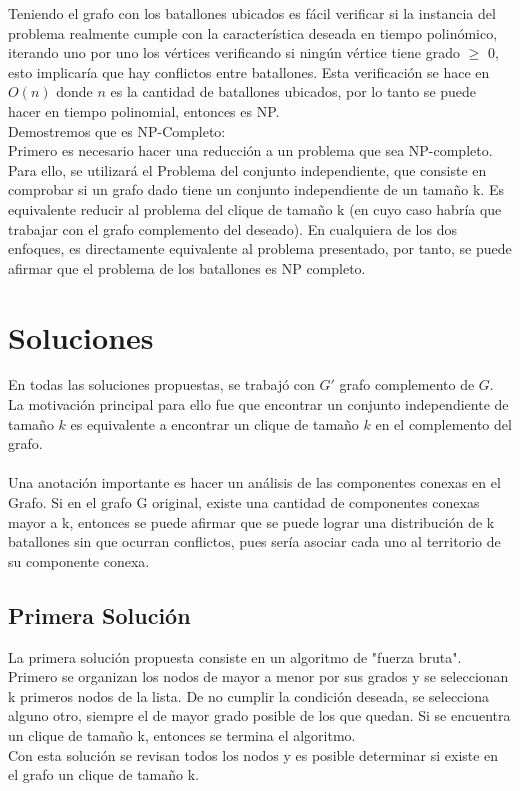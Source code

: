 \documentclass{article}
\begin{document}
Teniendo el grafo con los batallones ubicados es fácil verificar si la instancia del problema realmente cumple con la característica deseada en tiempo polinómico, iterando uno por uno los vértices verificando si ningún vértice tiene grado $\ge$ 0, esto implicaría que hay conflictos entre batallones. Esta verificación se hace en $O(n)$ donde $n$ es la cantidad de batallones ubicados, por lo tanto se puede hacer en tiempo polinomial, entonces es NP.
\\
Demostremos que es NP-Completo:
\\
Primero es necesario hacer una reducción a un problema que sea NP-completo. Para ello, se utilizará el Problema del conjunto independiente, que consiste en comprobar si un grafo dado tiene un conjunto independiente de un tamaño k. Es equivalente reducir al problema del clique de tamaño k (en cuyo caso habría que trabajar con el grafo complemento del deseado). En cualquiera de los dos enfoques, es directamente equivalente al problema presentado, por tanto, se puede afirmar que el problema de los batallones es NP completo.
\\
\section{Soluciones}
En todas las soluciones propuestas, se trabajó con $G'$ grafo complemento de $G$. La motivación principal para ello fue que encontrar un conjunto independiente de tamaño $k$ es equivalente a encontrar un clique de tamaño $k$ en el complemento del grafo.
\\
\\
Una anotación importante es hacer un análisis de las componentes conexas en el Grafo. Si en el grafo G original, existe una cantidad de componentes conexas mayor a k, entonces se puede afirmar que se puede lograr una distribución de k batallones sin que ocurran conflictos, pues sería asociar cada uno al territorio de su componente conexa.

\subsection{Primera Solución}
La primera solución propuesta consiste en un algoritmo de "fuerza bruta".
\\
Primero se organizan los nodos de mayor a menor por sus grados y se seleccionan k primeros nodos de la lista. De no cumplir la condición deseada, se selecciona alguno otro, siempre el de mayor grado posible de los que quedan. Si se encuentra un clique de tamaño k, entonces se termina el algoritmo.
\\
Con esta solución se revisan todos los nodos y es posible determinar si existe en el grafo un clique de tamaño k.
\end{document}
